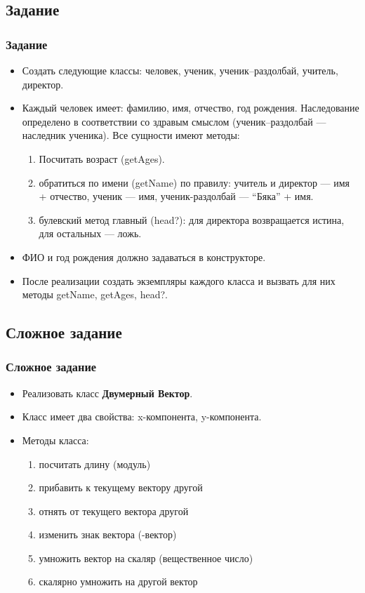 \documentclass[compress,red]{beamer}
\begin{document}
\subsection{Задание}
\begin{frame}[fragile]
  \frametitle{Задание}
  \begin{itemize}
    \item Создать следующие классы: человек, ученик, ученик--раздолбай, учитель, директор. 
    \item Каждый человек имеет: фамилию, имя, отчество, год рождения. Наследование определено в соответствии со здравым смыслом (ученик--раздолбай --- наследник ученика). Все сущности имеют методы:
     \begin{enumerate}
      \item Посчитать возраст (getAges).
      \item обратиться по имени (getName) по правилу: учитель и директор --- имя + отчество, ученик --- имя, ученик-раздолбай --- ``Бяка'' + имя. 
      \item булевский метод главный (head?): для директора возвращается истина, для остальных --- ложь.
     \end{enumerate} 
    \item ФИО и год рождения должно задаваться в конструкторе.
    \item После реализации создать экземпляры каждого класса и вызвать для них методы getName, getAges, head?.
  \end{itemize}
\end{frame}

\subsection{Сложное задание}
\begin{frame}[fragile]
  \frametitle{Сложное задание}
  \begin{itemize}
    \item Реализовать класс \textbf{Двумерный Вектор}. 
    \item Класс имеет два свойства: x-компонента, y-компонента. 
    \item Методы класса:
      \begin{enumerate}
        \item посчитать длину (модуль)
        \item прибавить к текущему вектору другой
        \item отнять от текущего вектора другой
        \item изменить знак вектора (-вектор)
        \item умножить вектор на скаляр (вещественное число)
        \item скалярно умножить на другой вектор
      \end{enumerate}
  \end{itemize}
\end{frame}
\end{document}

